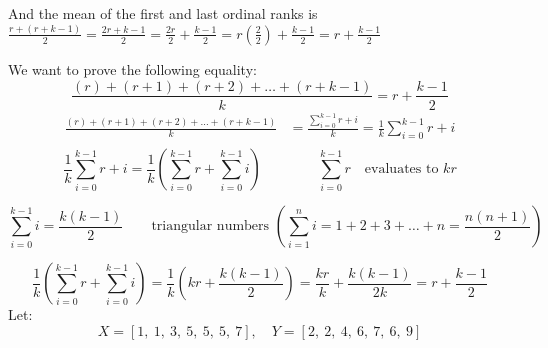 \documentclass{article}
\begin{document}
And the mean of the first and last ordinal ranks is $\frac{r + (r+k-1)}{2} = \frac{2r+k-1}{2} = \frac{2r}{2} + \frac{k-1}{2} = r (\frac{2}{2}) + \frac{k-1}{2} = r + \frac{k-1}{2}$

We want to prove the following equality:
\[
\frac{(r)+ (r+1)+ (r+2)+ \dots + (r+k-1)}{k} = r + \frac{k-1}{2}
\]
\begin{align*}
\frac{(r)+ (r+1)+ (r+2)+ \dots + (r+k-1)}{k} &= 
\frac{\sum_{i=0}^{k-1} r + i}{k} = \frac{1}{k}\sum_{i=0}^{k-1} r + i \\
\end{align*}
\[
\frac{1}{k}\sum_{i=0}^{k-1} r + i = \frac{1}{k} (\sum_{i=0}^{k-1} r + \sum_{i=0}^{k-1} i) \qquad \qquad \sum_{i=0}^{k-1} r \quad \text{evaluates to }kr
\]

\[
\sum_{i=0}^{k-1} i = \frac{k(k-1)}{2} \qquad \text{triangular numbers } (\sum_{i=1}^n i = 1+2+3+ \dots +n = \frac{n (n+1)}{2})
\]

\[
\frac{1}{k} (\sum_{i=0}^{k-1} r + \sum_{i=0}^{k-1} i) = 
\frac{1}{k} (kr + \frac{k(k-1)}{2}) =
\frac{kr}{k} +  \frac{k(k-1)}{2k} = 
r + \frac{k-1}{2}
\]
Let:
\[
X = [1,\ 1,\ 3,\ 5,\ 5,\ 5,\ 7], \quad
Y = [2,\ 2,\ 4,\ 6,\ 7,\ 6,\ 9]
\]
\end{document}
